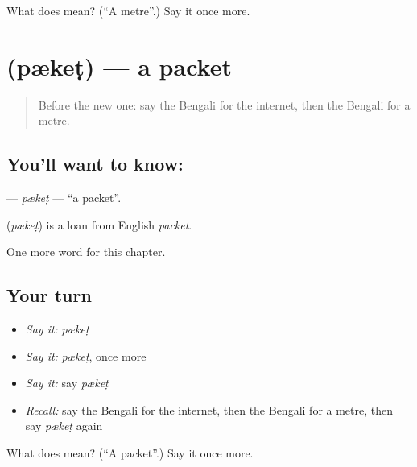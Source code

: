 \begin{tcolorbox}[breakable,colback=teal!4,colframe=teal!35!black,title={Before you move on}]
What does  mean? (\textquotedblleft{}A metre\textquotedblright{}.) Say it once more.
\end{tcolorbox}
\section[\texorpdfstring{\bn{প্যাকেট} (pækeṭ)}{প্যাকেট (pækeṭ)}]{ (pækeṭ) — a packet}

\label{lesson:BN-C233-pket}



\begin{quote}
Before the new one: say the Bengali for the internet, then the Bengali for a metre.
\end{quote}

\subsection*{You'll want to know: }
\textbf{} — \emph{pækeṭ} — \textquotedblleft{}a packet\textquotedblright{}.

\begin{cousinweb}
\textbf{} (\emph{pækeṭ}) is a loan from English \emph{packet}.
\end{cousinweb}

\begin{grammarlens}[title={What you've built}]
One more word for this chapter.
\end{grammarlens}

\subsection*{Your turn}
\begin{itemize}
\raggedright
  \item \emph{Say it:} \emph{pækeṭ}
  \item \emph{Say it:} \emph{pækeṭ}, once more
  \item \emph{Say it:} say \emph{pækeṭ}
  \item \emph{Recall:} say the Bengali for the internet, then the Bengali for a metre, then say \emph{pækeṭ} again
\end{itemize}

\begin{tcolorbox}[breakable,colback=teal!4,colframe=teal!35!black,title={Before you move on}]
What does  mean? (\textquotedblleft{}A packet\textquotedblright{}.) Say it once more.
\end{tcolorbox}
